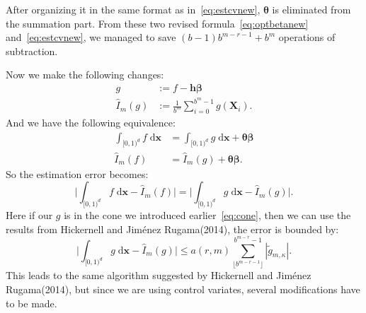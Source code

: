After organizing it in the same format as in~\eqref{eq:estcvnew}, $\boldsymbol{\theta}$ is eliminated from the summation part. 
From these two revised formula~\eqref{eq:optbetanew} and~\eqref{eq:estcvnew}, we managed to save $(b-1)b^{m-r-1}+b^m$ operations of subtraction.

\newpage
{}

Now we make the following changes:
\begin{align*}
    g&:=f-\boldsymbol{h}\boldsymbol{\beta}\\ 
    \hat{I}_m({g})&:= \frac{1}{b^m}\sum_{i=0}^{b^m-1}g(\mathbf{X}_i).
\end{align*}
And we have the following equivalence:
\begin{align*}
    \int_{[0,1)^d}f\;\textrm{d}\mathbf{x} &= \int_{[0,1)^d}g\;\textrm{d}\mathbf{x} +\boldsymbol{\theta\beta}\\ 
    \hat{I}_m(f) &= \hat{I}_m(g)+\boldsymbol{\theta\beta}.
\end{align*}
So the estimation error becomes:
\[
    \Big| \int_{[0,1)^d}f\;\textrm{d}\mathbf{x}- \hat{I}_m(f) \Big|
    =\Big| \int_{[0,1)^d}g\;\textrm{d}\mathbf{x}- \hat{I}_m(g) \Big|.
\]
Here if our $g$ is in the cone we introduced earlier~\eqref{eq:cone}, then we can use the results from Hickernell and Jiménez Rugama(2014)\cite{hickernell2014reliable}, the error is bounded by:
\[
\Big|\int_{[0,1)^d}g\;\textrm{d}\mathbf{x} - \hat{I}_m(g)\Big| \leq a(r,m) \sum_{\lfloor b^{m-r-1} \rfloor}^{b^{m-r}-1} |\tilde{g}_{m,\kappa}|.
\]
This leads to the same algorithm suggested by Hickernell and Jiménez Rugama(2014)\cite{hickernell2014reliable}, but since we are using control variates, several modifications have to be made.


